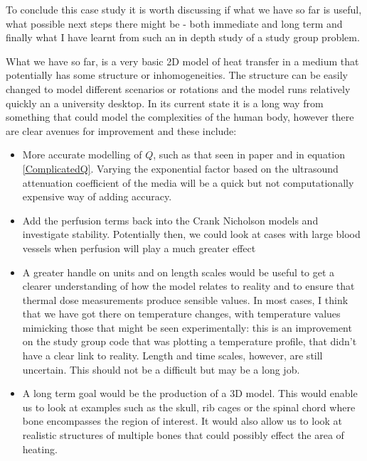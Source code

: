 \documentclass[11pt]{article} %
\begin{document}
To conclude this case study it is worth discussing if what we have so far is useful, what possible next steps there might be - both immediate and long term and finally what I have learnt from such an in depth study of a study group problem. 

What we have so far, is a very basic 2D model of heat transfer in a medium that potentially has some structure or inhomogeneities. The structure can be easily changed to model different scenarios  or rotations and the model runs relatively quickly an a university desktop. In its current state it is a long way from something that could model the complexities of the human body, however there are clear avenues for improvement and these include: 

\begin{itemize}
	\item More accurate modelling of $ Q $, such as that seen in paper \cite{Scott2014} and in equation \ref{ComplicatedQ}. Varying the exponential factor based on the ultrasound attenuation coefficient of the media will be a quick but not computationally expensive way of adding accuracy. 
	\item Add the perfusion terms back into the Crank Nicholson models and investigate stability. Potentially then, we could look at cases with large blood vessels when perfusion will play a much greater effect
	\item A greater handle on units and on length scales would be useful to get a clearer understanding of how the model relates to reality and to ensure that thermal dose measurements produce sensible values. In most cases, I think that we have got there on temperature changes, with temperature values mimicking those that might be seen experimentally: this is an improvement on the study group code that was plotting a temperature profile, that didn't have a clear link to reality.  Length and time scales, however,  are still uncertain. This should not be a difficult but may be a long job.
	\item A long term goal would be the production of a  3D model. This would enable us  to look at examples such as the skull, rib cages or the spinal chord where bone encompasses the region of interest. It would also allow us to look at realistic structures of multiple bones that could possibly effect the area of heating.
\end{itemize}
\end{document}
